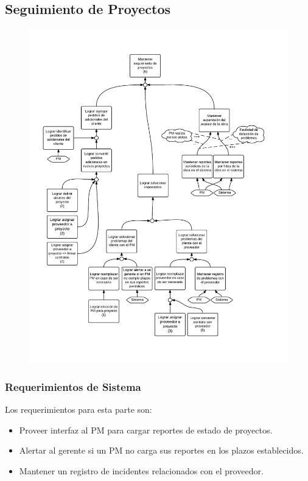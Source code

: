 \subsection{Seguimiento de Proyectos}
\begin{figure}[H]
\includegraphics[width=\textwidth, clip=true, trim=15pt 50pt 15pt 60pt]{imagenes/objetivos/objetivos14.pdf}
\end{figure}

\subsubsection{Requerimientos de Sistema}
Los requerimientos para esta parte son:
\begin{itemize}
	\item Proveer interfaz al PM para cargar reportes de estado de proyectos.
	\item Alertar al gerente si un PM no carga sus reportes en los plazos establecidos.
	\item Mantener un registro de incidentes relacionados con el proveedor.
\end{itemize}

